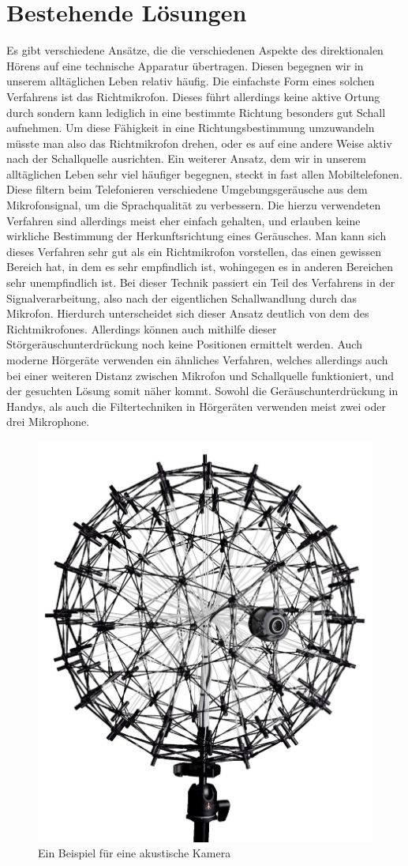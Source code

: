 \documentclass[10pt,a4paper]{article}
\begin{document}
  \section{Bestehende Lösungen} 
  Es gibt verschiedene Ansätze, die die verschiedenen Aspekte des direktionalen Hörens auf eine technische Apparatur übertragen. Diesen begegnen wir in unserem alltäglichen Leben relativ häufig. Die einfachste Form eines solchen Verfahrens ist das Richtmikrofon. Dieses führt allerdings keine aktive Ortung durch sondern kann lediglich in eine bestimmte Richtung besonders gut Schall aufnehmen. Um diese Fähigkeit in eine Richtungsbestimmung umzuwandeln müsste man also das Richtmikrofon drehen, oder es auf eine andere Weise aktiv nach der Schallquelle ausrichten. Ein weiterer Ansatz, dem wir in unserem alltäglichen Leben sehr viel häufiger begegnen, steckt in fast allen Mobiltelefonen. Diese filtern beim Telefonieren verschiedene Umgebungsgeräusche aus dem Mikrofonsignal, um die Sprachqualität zu verbessern. Die hierzu verwendeten Verfahren sind allerdings meist eher einfach gehalten, und erlauben keine wirkliche Bestimmung der Herkunftsrichtung eines Geräusches. Man kann sich dieses Verfahren sehr gut als ein Richtmikrofon vorstellen, das einen gewissen Bereich hat, in dem es sehr empfindlich ist, wohingegen es in anderen Bereichen sehr unempfindlich ist. Bei dieser Technik passiert ein Teil des Verfahrens in der Signalverarbeitung, also nach der eigentlichen Schallwandlung durch das Mikrofon. Hierdurch unterscheidet sich dieser Ansatz deutlich von dem des Richtmikrofones. Allerdings können auch mithilfe dieser Störgeräuschunterdrückung noch keine Positionen ermittelt werden. Auch moderne Hörgeräte verwenden ein ähnliches Verfahren, welches allerdings auch bei einer weiteren Distanz zwischen Mikrofon und Schallquelle funktioniert, und der gesuchten Lösung somit näher kommt. Sowohl die Geräuschunterdrückung in Handys, als auch die Filtertechniken in Hörgeräten verwenden meist zwei oder drei Mikrophone.
  \begin{figure}
  	\centering
  	\includegraphics[width=0.35\linewidth]{akusticCamera}
  	\caption{Ein Beispiel für eine akustische Kamera \cite{camera}}
  	\label{fig:camera}
  \end{figure}
\end{document}
